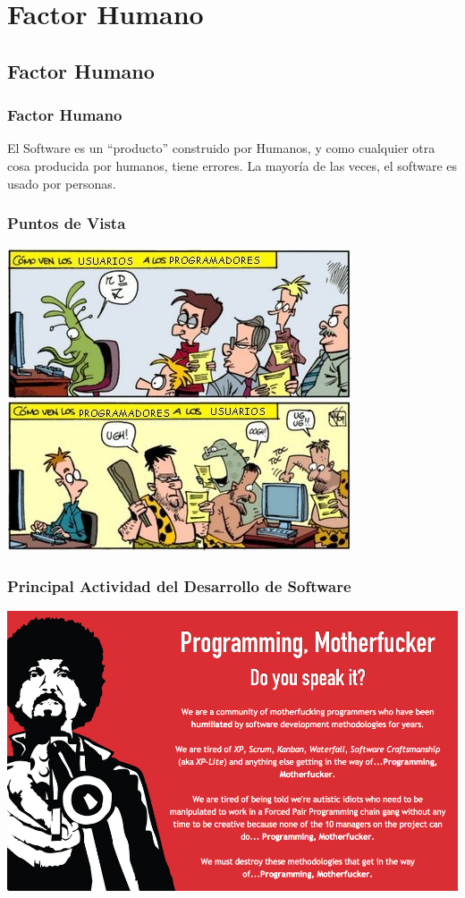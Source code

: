 \documentclass[12pt]{beamer}
\begin{document}
\section{Factor Humano}
\subsection{Factor Humano}

\begin{frame}
 \frametitle{Factor Humano}
 El Software es un ``producto'' construido por Humanos, y como cualquier otra cosa producida por humanos, tiene \alert{errores}.
 \newline
 \pause
 La mayoría de las veces, el software es usado por personas.
\end{frame}

\begin{frame}
 \frametitle{Puntos de Vista}
 \includegraphics[scale=0.5]{img/puntos_vista.png}
\end{frame}


\begin{frame}
 \frametitle{Principal Actividad del Desarrollo de Software}
 \pause
 \includegraphics[scale=0.3]{img/programaCTM.png}
\end{frame}
\end{document}
